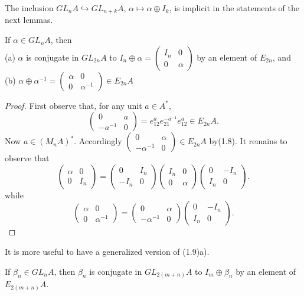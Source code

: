 The inclusion $GL_nA\hookrightarrow GL_{n+k}A$, $\alpha\mapsto \alpha\oplus I_k$, is implicit in the statements of the next lemmas.
\begin{lemma}
If $\alpha \in GL_nA$, then\\
(a) $\alpha$ is conjugate in $GL_{2n}A$ to $I_n\oplus \alpha=\begin{pmatrix} I_n & 0 \\ 0 &  \alpha \end{pmatrix}$ by an element of $E_{2n}$, and\\
(b) $\alpha\oplus \alpha^{-1}=\begin{pmatrix} \alpha & 0 \\ 0 &  \alpha^{-1} \end{pmatrix}\in E_{2n}A$
\end{lemma}
\begin{proof}
First observe that, for any unit $a\in A^*$,
\[\begin{pmatrix} 0 & a \\ -a^{-1} &  0 \end{pmatrix}=e_{12}^ae_{21}^{-a^{-1}}e_{12}^{a}\in E_{2n} A.\]
Now $a\in (M_nA)^*$. Accordingly $\begin{pmatrix} 0 & \alpha \\ -\alpha^{-1} &  0 \end{pmatrix}\in E_{2n}A$ by(1.8). It remains to observe that
\[\begin{pmatrix} \alpha &  0\\ 0 &  I_n\end{pmatrix}=\begin{pmatrix} 0 & I_n \\ -I_n &  0 \end{pmatrix}\begin{pmatrix}  I_n&  0\\ 0 & \alpha \end{pmatrix}\begin{pmatrix} 0 & -I_n \\ I_n &  0 \end{pmatrix}.\]
while
\[\begin{pmatrix} \alpha & 0 \\ 0 &  \alpha^{-1} \end{pmatrix}=\begin{pmatrix} 0 & \alpha \\ -\alpha^{-1} &  0 \end{pmatrix}\begin{pmatrix} 0 & -I_n \\ I_n &  0 \end{pmatrix}.\]
\end{proof}
It is more useful to have a generalized version of (1.9)a).
\begin{prop}
If $\beta_n\in GL_nA$, then $\beta_n$ is conjugate in $GL_{2(m+n)}A$ to $I_m\oplus \beta_n$ by an element of
$E_{2(m+n)}A$.
\end{prop}


